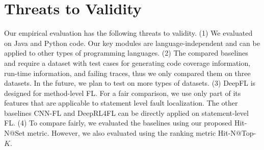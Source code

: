 \section{Threats to Validity}
Our empirical evaluation has the following threats to validity. (1) We
evaluated {\tool} on Java and Python code. Our key modules are
language-independent and can be applied to other types of programming
languages.  (2) The compared baselines and {\tool} require a dataset
with test cases for generating code coverage information, run-time
information, and failing traces, thus we only compared them on three
datasets. In the future, we plan to test {\tool} on more types of
datasets. (3) DeepFL is designed for method-level FL. For a fair
comparison, we use only part of its features that are applicable to
statement level fault localization. The other baselines CNN-FL and
DeepRL4FL can be directly applied on statement-level FL. (4) To
compare fairly, we evaluated the baselines using our proposed
Hit-N@Set metric. However, we also evaluated {\tool} using the ranking
metric Hit-N@Top-$K$.



